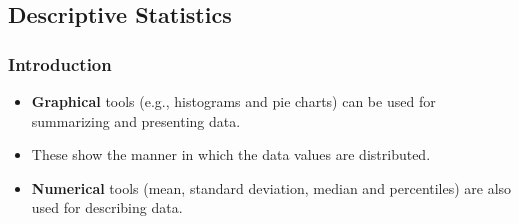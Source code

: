 \documentclass[t]{beamer}
\begin{document}
\subsection{Descriptive Statistics}
\begin{frame}[t]\frametitle{Introduction}

{\small
\begin{itemize}
\item  \textbf{Graphical} tools (e.g., histograms
  and pie charts) can be used for summarizing and presenting data.
\item These show the manner in which the data values are distributed.
\item  \textbf{Numerical} tools (mean, standard deviation, median and percentiles) 
   are also used for describing data.
\end{itemize}
}


\end{frame}
\end{document}
